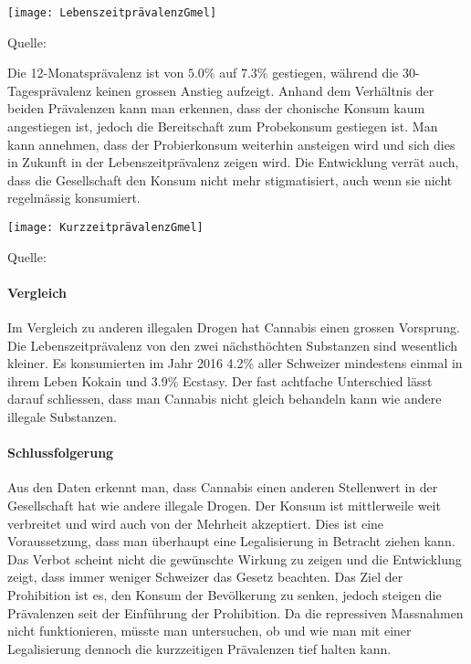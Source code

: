 \documentclass[../main.tex]{subfiles}
\begin{document}
	\noindent
	{
		\centering
		\texttt{[image: LebenszeitprävalenzGmel]}
		\captionsetup{font=small}
		\small 
		\noindent
		\begin{center}
		Quelle: \cite{gmel}
		\end{center}
	}
	
	\noindent
	Die 12-Monatsprävalenz ist von $5.0\%$ auf $7.3\%$ gestiegen, während die 30-Tagesprävalenz keinen grossen Anstieg aufzeigt. 
	Anhand dem Verhältnis der beiden Prävalenzen kann man erkennen, dass der chonische Konsum kaum angestiegen ist, jedoch die Bereitschaft zum Probekonsum gestiegen ist. 
	Man kann annehmen, dass der Probierkonsum weiterhin ansteigen wird und sich dies in Zukunft in der Lebenszeitprävalenz zeigen wird.
	Die Entwicklung verrät auch, dass die Gesellschaft den Konsum nicht mehr stigmatisiert, auch wenn sie nicht regelmässig konsumiert.\\
	
	\noindent
	{
		\centering
		\texttt{[image: KurzzeitprävalenzGmel]}
		\captionsetup{font=small}
		\small 
		\noindent
		\begin{center}
		Quelle: \cite{gmel}
		\end{center}
	}
	
	\paragraph{Vergleich}
	Im Vergleich zu anderen illegalen Drogen hat Cannabis einen grossen Vorsprung.
	Die Lebenszeitprävalenz von den zwei nächsthöchten Substanzen sind wesentlich kleiner.
	Es konsumierten im Jahr 2016 4.2\% aller Schweizer mindestens einmal in ihrem Leben Kokain und 3.9\% Ecstasy.
	Der fast achtfache Unterschied lässt darauf schliessen, dass man Cannabis nicht gleich behandeln kann wie andere illegale Substanzen. 
	
	\paragraph{Schlussfolgerung}
	Aus den Daten erkennt man, dass Cannabis einen anderen Stellenwert in der Gesellschaft hat wie andere illegale Drogen.
	Der Konsum ist mittlerweile weit verbreitet und wird auch von der Mehrheit akzeptiert.
	Dies ist eine Voraussetzung, dass man überhaupt eine Legalisierung in Betracht ziehen kann.
	Das Verbot scheint nicht die gewünschte Wirkung zu zeigen und die Entwicklung zeigt, dass immer weniger Schweizer das Gesetz beachten.
	Das Ziel der Prohibition ist es, den Konsum der Bevölkerung zu senken, jedoch steigen die Prävalenzen seit der Einführung der Prohibition.
	Da die repressiven Massnahmen nicht funktionieren, müsste man untersuchen, ob und wie man mit einer Legalisierung dennoch die kurzzeitigen Prävalenzen tief halten kann.
	
\end{document}
